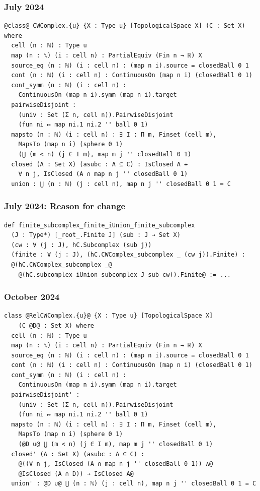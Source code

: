 \documentclass{beamer}
\begin{document}
\begin{frame}[fragile]
\frametitle{July 2024}
\begin{lstlisting}[basicstyle=\ttfamily\scriptsize]
@class@ CWComplex.{u} {X : Type u} [TopologicalSpace X] (C : Set X) where
  cell (n : ℕ) : Type u
  map (n : ℕ) (i : cell n) : PartialEquiv (Fin n → ℝ) X
  source_eq (n : ℕ) (i : cell n) : (map n i).source = closedBall 0 1
  cont (n : ℕ) (i : cell n) : ContinuousOn (map n i) (closedBall 0 1)
  cont_symm (n : ℕ) (i : cell n) : 
    ContinuousOn (map n i).symm (map n i).target
  pairwiseDisjoint :
    (univ : Set (Σ n, cell n)).PairwiseDisjoint 
    (fun ni ↦ map ni.1 ni.2 '' ball 0 1)
  mapsto (n : ℕ) (i : cell n) : ∃ I : Π m, Finset (cell m),
    MapsTo (map n i) (sphere 0 1) 
    (⋃ (m < n) (j ∈ I m), map m j '' closedBall 0 1)
  closed (A : Set X) (asubc : A ⊆ C) : IsClosed A ↔ 
    ∀ n j, IsClosed (A ∩ map n j '' closedBall 0 1)
  union : ⋃ (n : ℕ) (j : cell n), map n j '' closedBall 0 1 = C
\end{lstlisting}
\end{frame}

\begin{frame}[fragile]
\frametitle{July 2024: Reason for change}
\begin{lstlisting}[basicstyle=\ttfamily\scriptsize]
def finite_subcomplex_finite_iUnion_finite_subcomplex 
  (J : Type*) [_root_.Finite J] (sub : J → Set X) 
  (cw : ∀ (j : J), hC.Subcomplex (sub j))
  (finite : ∀ (j : J), (hC.CWComplex_subcomplex _ (cw j)).Finite) : 
  @(hC.CWComplex_subcomplex _@
    @(hC.subcomplex_iUnion_subcomplex J sub cw)).Finite@ := ...
\end{lstlisting}
\end{frame}

\begin{frame}[fragile]
\frametitle{October 2024}
\begin{lstlisting}[basicstyle=\ttfamily\scriptsize]
class @RelCWComplex.{u}@ {X : Type u} [TopologicalSpace X]
    (C @D@ : Set X) where
  cell (n : ℕ) : Type u
  map (n : ℕ) (i : cell n) : PartialEquiv (Fin n → ℝ) X
  source_eq (n : ℕ) (i : cell n) : (map n i).source = closedBall 0 1
  cont (n : ℕ) (i : cell n) : ContinuousOn (map n i) (closedBall 0 1)
  cont_symm (n : ℕ) (i : cell n) : 
    ContinuousOn (map n i).symm (map n i).target
  pairwiseDisjoint' :
    (univ : Set (Σ n, cell n)).PairwiseDisjoint 
    (fun ni ↦ map ni.1 ni.2 '' ball 0 1)
  mapsto (n : ℕ) (i : cell n) : ∃ I : Π m, Finset (cell m),
    MapsTo (map n i) (sphere 0 1) 
    (@D ∪@ ⋃ (m < n) (j ∈ I m), map m j '' closedBall 0 1)
  closed' (A : Set X) (asubc : A ⊆ C) :
    @((∀ n j, IsClosed (A ∩ map n j '' closedBall 0 1)) ∧@
    @IsClosed (A ∩ D)) → IsClosed A@
  union' : @D ∪@ ⋃ (n : ℕ) (j : cell n), map n j '' closedBall 0 1 = C
\end{lstlisting}
\end{frame}
\end{document}

